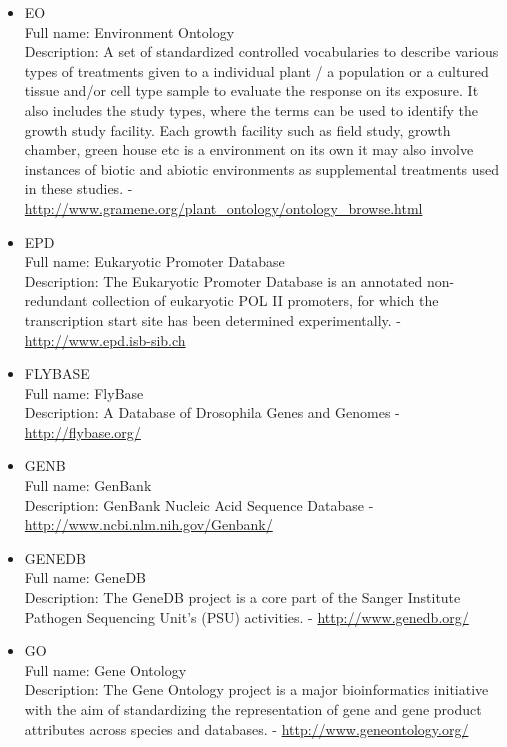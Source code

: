 \begin{itemize}
\item{EO}\\ Full name: Environment Ontology\\ Description: A set of standardized controlled vocabularies to describe various types of treatments given to a individual plant / a population or a cultured tissue and/or cell type sample to evaluate the response on its exposure. It also includes the study types, where the terms can be used to identify the growth study facility. Each growth facility such as field study, growth chamber, green house etc is a environment on its own it may also involve instances of biotic and abiotic environments as supplemental treatments used in these studies. - 
\url{http://www.gramene.org/plant\_ontology/ontology\_browse.html}

\item{EPD}\\ Full name: Eukaryotic Promoter Database\\ Description: The Eukaryotic Promoter Database is an annotated non-redundant collection of eukaryotic POL II promoters, for which the transcription start site has been determined experimentally. - 
\url{http://www.epd.isb-sib.ch}

\item{FLYBASE}\\ Full name: FlyBase\\ Description: A Database of Drosophila Genes and Genomes - 
\url{http://flybase.org/}

\item{GENB}\\ Full name: GenBank\\ Description: GenBank Nucleic Acid Sequence Database - 
\url{http://www.ncbi.nlm.nih.gov/Genbank/}

\item{GENEDB}\\ Full name: GeneDB\\ Description: The GeneDB project is a core part of the Sanger Institute Pathogen Sequencing Unit's (PSU) activities. - 
\url{http://www.genedb.org/}

\item{GO}\\ Full name: Gene Ontology\\ Description: The Gene Ontology project is a major bioinformatics initiative with the aim of standardizing the representation of gene and gene product attributes across species and databases. - 
\url{http://www.geneontology.org/}


\end{itemize}
